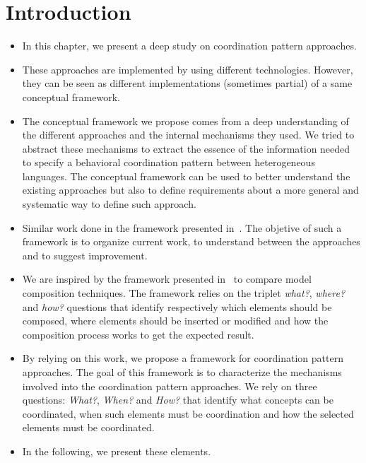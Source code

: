 \section{Introduction}
\begin{itemize}
\item In this chapter, we present a deep study on coordination pattern approaches. 

\item These approaches are implemented by using different technologies. However, they can be seen as different implementations (sometimes partial) of a same conceptual framework.

\item The conceptual framework we propose comes from a deep understanding of the different approaches and the internal mechanisms they used. We tried to abstract these mechanisms to extract the essence of the information needed to specify a behavioral coordination pattern between heterogeneous languages. The conceptual framework can be used to better understand the existing approaches but also to define requirements about a more general and systematic way to define such approach.

\item Similar work done in the framework presented in~\cite{frameadlsbib}. The objetive of such a framework is to organize current work, to understand between the approaches and to suggest improvement. 

\item We are inspired by the framework presented in~\cite{framecompoas} to compare model
composition techniques. The framework relies on the triplet \emph{what?}, \emph{where?} and \emph{how?} questions that identify respectively which elements should be composed, where elements should be inserted or modified and how the composition process works to get the expected result. 


\item By relying on this work, we propose a framework for coordination pattern approaches. The goal of this framework is to characterize the mechanisms involved into the coordination pattern approaches. We rely on three questions: \emph{What?}, \emph{When?} and \emph{How?} that identify what concepts can be coordinated, when such elements must be coordination and how the selected elements must be coordinated.   
 

\item In the following, we present these elements.     
	
\end{itemize}
